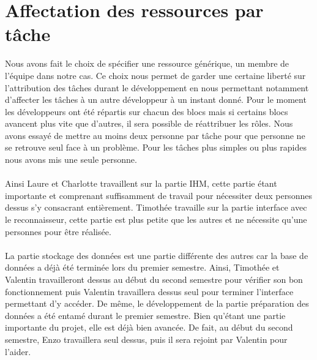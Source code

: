 \section{Affectation des ressources par tâche}

Nous avons fait le choix de spécifier une ressource générique, un membre de l’équipe dans notre cas. Ce choix nous permet de garder une certaine liberté sur l’attribution des tâches durant le développement en nous permettant notamment d’affecter les tâches à un autre développeur à un instant donné. Pour le moment les développeurs ont été répartis sur chacun des blocs mais si certains blocs avancent plus vite que d’autres, il sera possible de réattribuer les rôles. Nous avons essayé de mettre au moins deux personne par tâche pour que personne ne se retrouve seul face à un problème. Pour les tâches plus simples ou plus rapides nous avons mis une seule personne.

\paragraph{}

Ainsi Laure et Charlotte travaillent sur la partie IHM, cette partie étant importante et comprenant suffisamment de travail pour nécessiter deux personnes dessus s’y consacrant entièrement. Timothée travaille sur la partie  interface avec le reconnaisseur, cette partie est plus petite que les autres et ne nécessite qu’une personnes pour être réalisée. 

\paragraph{}

La partie stockage des données est une partie différente des autres car la base de données a déjà été terminée lors du premier semestre. Ainsi, Timothée et Valentin travailleront dessus au début du second semestre pour vérifier son bon fonctionnement puis Valentin travaillera dessus seul pour terminer l’interface permettant d’y accéder. De même, le développement de la partie préparation des données a été entamé durant le premier semestre. Bien qu’étant une partie importante du projet, elle est déjà bien avancée. De fait, au début du second semestre, Enzo travaillera seul dessus, puis il sera rejoint par Valentin pour l’aider.

\paragraph{}

